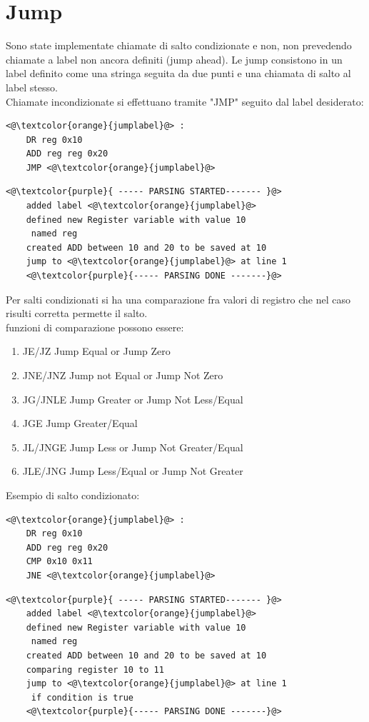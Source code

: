 \section{Jump}
Sono state implementate chiamate di salto condizionate e non, non prevedendo chiamate a label non ancora definiti (jump ahead).
Le jump consistono in un label definito come una stringa seguita da due punti e una chiamata di salto al label stesso.
\\Chiamate incondizionate si effettuano tramite "JMP" seguito dal label desiderato:
\begin{lstlisting}[caption=input]
    <@\textcolor{orange}{jumplabel}@> :
    DR reg 0x10
    ADD reg reg 0x20
    JMP <@\textcolor{orange}{jumplabel}@>
\end{lstlisting}

\begin{lstlisting}[caption=output]
    <@\textcolor{purple}{ ----- PARSING STARTED------- }@>
    added label <@\textcolor{orange}{jumplabel}@>
    defined new Register variable with value 10 
     named reg
    created ADD between 10 and 20 to be saved at 10
    jump to <@\textcolor{orange}{jumplabel}@> at line 1
    <@\textcolor{purple}{----- PARSING DONE -------}@>
\end{lstlisting}
Per salti condizionati si ha una comparazione fra valori di registro che nel caso risulti corretta permette il salto.
\\funzioni di comparazione possono essere:
\begin{enumerate}
    \item JE/JZ     Jump Equal or Jump Zero
    \item JNE/JNZ 	Jump not Equal or Jump Not Zero
    \item JG/JNLE 	Jump Greater or Jump Not Less/Equal 
    \item JGE 	    Jump Greater/Equal
    \item JL/JNGE 	Jump Less or Jump Not Greater/Equal
    \item JLE/JNG 	Jump Less/Equal or Jump Not Greater
\end{enumerate}
Esempio di salto condizionato:
\begin{lstlisting}[caption=input]
    <@\textcolor{orange}{jumplabel}@> :
    DR reg 0x10
    ADD reg reg 0x20
    CMP 0x10 0x11
    JNE <@\textcolor{orange}{jumplabel}@>
\end{lstlisting}
\begin{lstlisting}[caption=output]
    <@\textcolor{purple}{ ----- PARSING STARTED------- }@>
    added label <@\textcolor{orange}{jumplabel}@>
    defined new Register variable with value 10 
     named reg
    created ADD between 10 and 20 to be saved at 10
    comparing register 10 to 11
    jump to <@\textcolor{orange}{jumplabel}@> at line 1
     if condition is true
    <@\textcolor{purple}{----- PARSING DONE -------}@>
\end{lstlisting}




